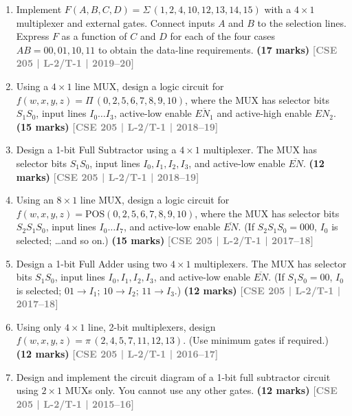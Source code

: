 \documentclass[12pt,a3paper]{article}
\newcommand{\yr}[1]{\hfill\textcolor{gray}{\small\textbf{[#1]}}}
\newcommand{\mk}[1]{\textcolor{orange!70!black}{\small\textbf{(#1 marks)}}}
\begin{document}
\begin{enumerate}
\item Implement $F(A,B,C,D) = \Sigma\,(1,2,4,10,12,13,14,15)$ with a $4\times1$ multiplexer and external gates. Connect inputs $A$ and $B$ to the selection lines. Express $F$ as a function of $C$ and $D$ for each of the four cases $AB=00,01,10,11$ to obtain the data-line requirements.
\mk{17} \yr{CSE 205 | L-2/T-1 | 2019--20}

\item Using a $4\times1$ line MUX, design a logic circuit for $f(w,x,y,z) = \Pi\,(0,2,5,6,7,8,9,10)$, where the MUX has selector bits $S_1S_0$, input lines $I_0\ldots I_3$, active-low enable $\overline{EN_1}$ and active-high enable $EN_2$.
\mk{15} \yr{CSE 205 | L-2/T-1 | 2018--19}

\item Design a 1-bit Full Subtractor using a $4\times1$ multiplexer. The MUX has selector bits $S_1S_0$, input lines $I_0, I_1, I_2, I_3$, and active-low enable $\overline{EN}$.
\mk{12} \yr{CSE 205 | L-2/T-1 | 2018--19}

\item Using an $8\times1$ line MUX, design a logic circuit for $f(w,x,y,z) = \mathrm{POS}(0,2,5,6,7,8,9,10)$, where the MUX has selector bits $S_2S_1S_0$, input lines $I_0\ldots I_7$, and active-low enable $\overline{EN}$. (If $S_2S_1S_0 = 000$, $I_0$ is selected; \ldots and so on.)
\mk{15} \yr{CSE 205 | L-2/T-1 | 2017--18}

\item Design a 1-bit Full Adder using two $4\times1$ multiplexers. The MUX has selector bits $S_1S_0$, input lines $I_0, I_1, I_2, I_3$, and active-low enable $\overline{EN}$. (If $S_1S_0 = 00$, $I_0$ is selected; $01 \to I_1$; $10 \to I_2$; $11 \to I_3$.)
\mk{12} \yr{CSE 205 | L-2/T-1 | 2017--18}

\item Using only $4\times1$ line, 2-bit multiplexers, design $f(w,x,y,z) = \pi\,(2,4,5,7,11,12,13)$. (Use minimum gates if required.)
\mk{12} \yr{CSE 205 | L-2/T-1 | 2016--17}

\item Design and implement the circuit diagram of a 1-bit full subtractor circuit using $2\times1$ MUXs only. You cannot use any other gates.
\mk{12} \yr{CSE 205 | L-2/T-1 | 2015--16}



\end{enumerate}
\end{document}
